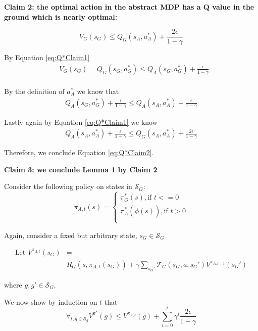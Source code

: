\documentclass{article}
\newcommand{\ep}{\widetilde \phi}
\begin{document}
\textbf{Claim 2: the optimal action in the abstract MDP has a Q value in the ground which is nearly optimal:}

\begin{equation}
\label{eq:Q*Claim2}
V_G(s_G) \leq Q_G(s_A, a^*_A) + \frac{2\epsilon}{1-\gamma}
\end{equation}


By Equation \ref{eq:Q*Claim1}
\begin{align}
&V_G(s_G) = Q_G(s_G, a^*_G) \leq Q_A(s_G, a^*_G) + \frac{\epsilon}{1-\gamma} \\
\label{eq:Q*OptActionResult}
\end{align}

 By the definition of $a^*_A$ we know that 
 \begin{align}
Q_A(s_G, a^*_G) + \frac{\epsilon}{1-\gamma} \leq Q_A(s_A, a^*_A) + \frac{\epsilon}{1-\gamma}
\end{align}

Lastly again by Equation \ref{eq:Q*Claim1} we know
\begin{align}
Q_A(s_A, a^*_A) + \frac{\epsilon}{1-\gamma} \leq Q_G(s_A, a^*_A) + \frac{2\epsilon}{1-\gamma}
\end{align}

Therefore, we conclude Equation \ref{eq:Q*Claim2}.

\textbf{Claim 3: we conclude Lemma 1 by Claim 2}

Consider the following policy on states in $\mathcal{S}_G$:
\begin{equation}
\pi_{A,t}(s)=
\begin{cases}
\pi_G^*(s), \text{if $t<=0$}\\
\pi_A^*(\ep(s)), \text{if $t > 0$}\\
\end{cases}
\end{equation}

Again, consider a fixed but arbitrary state, $s_G \in \mathcal{S}_G$


\begin{align*}
\text{Let }V^{\pi_{A,t}}(s_G) &= \\
&R_G(s, \pi_{A,t}(s_G)) + \gamma \sum_{{s_G}'}\mathcal{T}_G(s_G, a, {s_G}')V^{\pi_{A,t-1}}({s_G}')
\end{align*}

where $g, g' \in \mathcal{S}_G$.

We now show by induction on $t$ that
\begin{equation}
\forall_{t, g \in \mathcal{S}_g} V^{\pi^*}(g) \leq  V^{\pi_{A,t}}(g) + \sum_{i=0}^{t}\gamma^i \frac{2\epsilon}{1-\gamma}
\end{equation}
\end{document}
